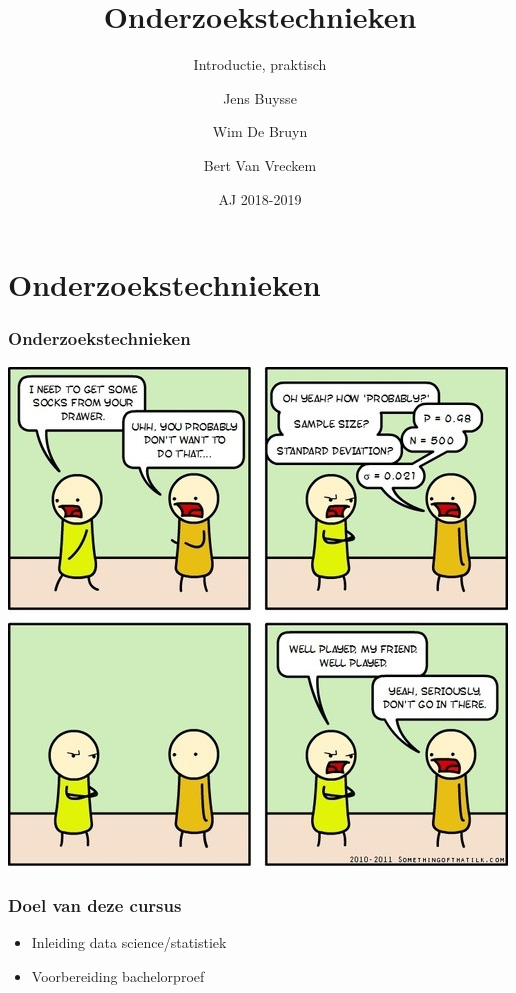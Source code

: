 \documentclass[aspectratio=169]{beamer}
\title[OZT: Intro]{Onderzoekstechnieken}
\subtitle{Introductie, praktisch}
\author{Jens Buysse \and Wim {De Bruyn} \and Bert {Van Vreckem}}
\date{AJ 2018-2019}
\begin{document}

\begin{frame}
  \maketitle
\end{frame}

\section{Onderzoekstechnieken}

\begin{frame}
  \frametitle{Onderzoekstechnieken}

  \centering
  \includegraphics[height=.8\textheight]{img/intro-01.jpg}
\end{frame}

\begin{frame}
  \frametitle{Doel van deze cursus}
  
  \begin{itemize}
    \item Inleiding data science/statistiek
    \item Voorbereiding bachelorproef
  \end{itemize}
\end{frame}
\end{document}
